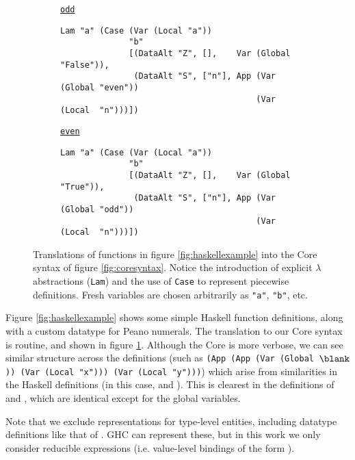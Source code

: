 \begin{figure}
\begin{subfigure}[factorial]{\textwidth}
\begin{small}
    \end{small}
  \end{subfigure}
  \begin{subfigure}[odd]{\textwidth}
    \begin{small}
      \underline{\texttt{odd}}
      \begin{verbatim}
Lam "a" (Case (Var (Local "a"))
              "b"
              [(DataAlt "Z", [],    Var (Global "False")),
               (DataAlt "S", ["n"], App (Var (Global "even"))
                                        (Var (Local  "n")))])
      \end{verbatim}
    \end{small}
  \end{subfigure}
  \begin{subfigure}[even]{\textwidth}
    \begin{small}
      \underline{\texttt{even}}
      \begin{verbatim}
Lam "a" (Case (Var (Local "a"))
              "b"
              [(DataAlt "Z", [],    Var (Global "True")),
               (DataAlt "S", ["n"], App (Var (Global "odd"))
                                        (Var (Local  "n")))])
      \end{verbatim}
    \end{small}
  \end{subfigure}
  \caption{Translations of functions in figure \ref{fig:haskellexample} into the Core syntax of figure \ref{fig:coresyntax}. Notice the introduction of explicit $\lambda$ abstractions (\texttt{Lam}) and the use of \texttt{Case} to represent piecewise definitions. Fresh variables are chosen arbitrarily as \texttt{"a"}, \texttt{"b"}, etc.}
  \label{fig:coreexample}
\end{figure}

Figure \ref{fig:haskellexample} shows some simple Haskell function definitions, along with a custom datatype for Peano numerals. The translation to our Core syntax is routine, and shown in figure \ref{fig:coreexample}. Although the Core is more verbose, we can see similar structure across the definitions (such as \texttt{(App (App (Var (Global $\blank$)) (Var (Local "x"))) (Var (Local "y")))}) which arise from similarities in the Haskell definitions (in this case,  and ). This is clearest in the definitions of  and , which are identical except for the global variables.

Note that we exclude representations for type-level entities, including datatype definitions like that of . GHC can represent these, but in this work we only consider reducible expressions (i.e. value-level bindings of the form ).

